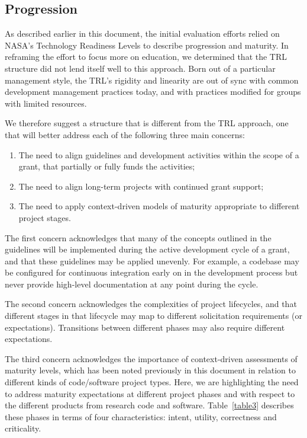 \documentclass{article}
\begin{document}
\subsection{Progression}
As described earlier in this document, the initial evaluation efforts relied on NASA’s Technology Readiness Levels to describe progression and maturity. In reframing the effort to focus more on education, we determined that the TRL structure did not lend itself well to this approach. Born out of a particular management style, the TRL’s rigidity and linearity are out of sync with common development management practices today, and with practices modified for groups with limited resources. 
 
We therefore suggest a structure that is different from the TRL approach, one that will better address each of the following three main concerns:

\begin{enumerate}
\item The need to align guidelines and development activities within the scope of a grant, that partially or fully funds the activities;
\item The need to align long-term projects with continued grant support;
\item The need to apply context-driven models of maturity appropriate to different project stages.
\end{enumerate}

The first concern acknowledges that many of the concepts outlined in the guidelines will be implemented during the active development cycle of a grant, and that these guidelines may be applied unevenly. For example, a codebase may be configured for continuous integration early on in the development process but never provide high-level documentation at any point during the cycle. 
 
The second concern acknowledges the complexities of project lifecycles, and that different stages in that lifecycle may map to different solicitation requirements (or expectations). Transitions between different phases may also require different expectations.
 
The third concern acknowledges the importance of context-driven assessments of maturity levels, which has been noted previously in this document in relation to different kinds of code/software project types. Here, we are highlighting the need to address maturity expectations at different project phases and with respect to the different products from research code and software. Table~\ref{table3} describes these phases in terms of four characteristics: intent, utility, correctness and criticality.
\end{document}
